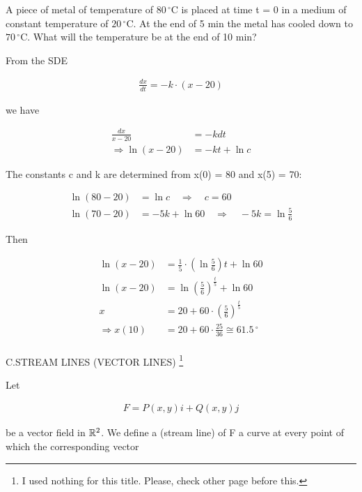 \documentclass[11pt]{amsbook}
\begin{document}

\begin{exmp}
A piece of metal of temperature of $80\,^{\circ}\mathrm{C}$ is placed at time t = 0 in a medium of constant temperature of $20\,^{\circ}\mathrm{C}$. At the end of 5 min the metal has cooled down to $70\,^{\circ}\mathrm{C}$. What will the temperature be at the end of 10 min?

\begin{hSolution}
From the SDE

\begin{align*}
	\frac{dx}{dt} = -k \cdot (x-20)
\end{align*}

\noindent we have

\begin{align*}
	\frac{dx}{x-20} &= -kdt\\
	\Longrightarrow \ln(x-20) &= -kt + \ln c
\end{align*}

\par 
The constants c and k are determined from x(0) = 80 and x(5) = 70:

\begin{align*}
	\ln(80-20) &= \ln c \quad  \Longrightarrow \quad c = 60\\
	\ln(70-20) &= -5k + \ln 60 \quad  \Longrightarrow \quad -5k = \ln \frac{5}{6}
\end{align*}

\par
Then

\begin{align*}
	\ln(x-20) &= \frac{1}{5} \cdot (\ln \frac{5}{6})t + \ln 60\\
	\ln(x-20) &=  \ln ({\frac{5}{6}})^{\frac{t}{5}} + \ln 60\\
	x &= 20 + 60 \cdot ({\frac{5}{6}})^{\frac{t}{5}}\\
	\Longrightarrow x(10) &= 20 + 60 \cdot \frac{25}{36} \cong 61.5\,^{\circ}\mathrm{}\\
\end{align*}

\end{hSolution}

\end{exmp}

\begin{center}
	{\Large C.}STREAM LINES (VECTOR LINES) \footnote{I used nothing for this title. Please, check other page before this.}
\end{center}

\par
Let

\begin{align*}
	F = P(x, y)i + Q(x, y)j
\end{align*}

\noindent be a vector field in $\mathbb{R}^2$. We define a  (stream line) of F a curve at every point of which the corresponding vector
\end{document}
